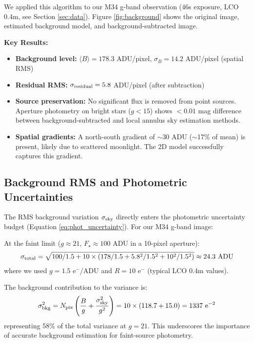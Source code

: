 \documentclass[linenumbers,trackchanges,twocolumn]{aastex701}
\begin{document}
We applied this algorithm to our M34 g-band observation (46s exposure, LCO 0.4m, see Section \ref{sec:data}). Figure \ref{fig:background} shows the original image, estimated background model, and background-subtracted image.

\textbf{Key Results:}
\begin{itemize}
\item \textbf{Background level:} $\langle B \rangle = 178.3$ ADU/pixel, $\sigma_B = 14.2$ ADU/pixel (spatial RMS)
\item \textbf{Residual RMS:} $\sigma_{\rm residual} = 5.8$ ADU/pixel (after subtraction)
\item \textbf{Source preservation:} No significant flux is removed from point sources. Aperture photometry on bright stars ($g < 15$) shows $< 0.01$ mag difference between background-subtracted and local annulus sky estimation methods.
\item \textbf{Spatial gradients:} A north-south gradient of $\sim 30$ ADU ($\sim$17\% of mean) is present, likely due to scattered moonlight. The 2D model successfully captures this gradient.
\end{itemize}

\subsection{Background RMS and Photometric Uncertainties}

The RMS background variation $\sigma_{\rm sky}$ directly enters the photometric uncertainty budget (Equation \ref{eq:phot_uncertainty}). For our M34 g-band image:

At the faint limit ($g \approx 21$, $F_\star \approx 100$ ADU in a 10-pixel aperture):
\begin{equation}
\sigma_{\rm total} = \sqrt{100/1.5 + 10 \times (178/1.5 + 5.8^2/1.5^2 + 10^2/1.5^2)} \approx 24.3 \text{ ADU}
\end{equation}
where we used $g = 1.5$ e$^-$/ADU and $R = 10$ e$^-$ (typical LCO 0.4m values).

The background contribution to the variance is:
\begin{equation}
\sigma_{\rm bkg}^2 = N_{\rm pix}\left(\frac{B}{g} + \frac{\sigma_{\rm sky}^2}{g^2}\right) = 10 \times (118.7 + 15.0) = 1337 \text{ e}^{-2}
\end{equation}
representing 58\% of the total variance at $g = 21$. This underscores the importance of accurate background estimation for faint-source photometry.
\end{document}
